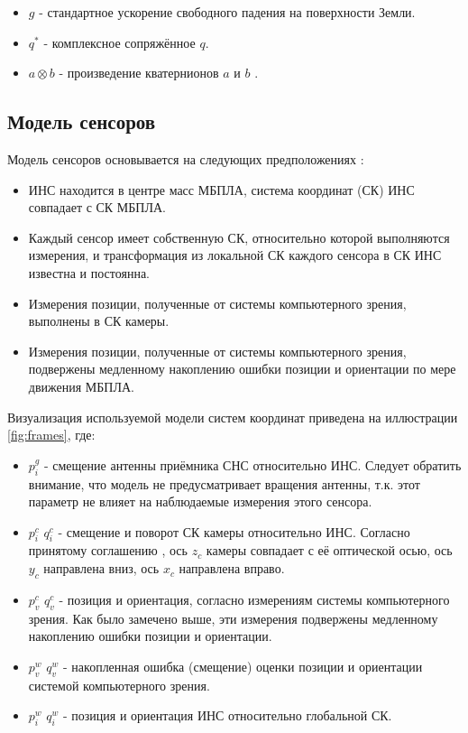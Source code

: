 \documentclass[11pt,a4paper]{article}
\begin{document}
\begin{itemize}
    \item $g$ - стандартное ускорение свободного падения на поверхности Земли.
    \item $q^*$ - комплексное сопряжённое $q$.
    \item $a \otimes b$ - произведение кватернионов $a$ и $b$ \cite{QuaternionsMadgwick}.
\end{itemize}

\subsection{Модель сенсоров}

Модель сенсоров основывается на следующих предположениях \cite{weiss2012vision}:

\begin{itemize}
    \item ИНС находится в центре масс МБПЛА, система координат (СК) ИНС совпадает с СК МБПЛА.
    \item Каждый сенсор имеет собственную СК, относительно которой выполняются измерения, и трансформация из локальной СК каждого сенсора в СК ИНС известна и постоянна.
    \item Измерения позиции, полученные от системы компьютерного зрения, выполнены в СК камеры.
    \item Измерения позиции, полученные от системы компьютерного зрения, подвержены медленному накоплению ошибки позиции и ориентации по мере движения МБПЛА.
\end{itemize}

Визуализация используемой модели систем координат приведена на иллюстрации \ref{fig:frames}, где:

\begin{itemize}
    \item $p_i^g$ - смещение антенны приёмника СНС относительно ИНС. Следует обратить внимание, что модель не предусматривает вращения антенны, т.к. этот параметр не влияет на наблюдаемые измерения этого сенсора.
    \item $p_i^c$ $q_i^c$ - смещение и поворот СК камеры относительно ИНС. Согласно принятому соглашению \cite{ROSFrames}, ось $z_c$ камеры совпадает с её оптической осью, ось $y_c$ направлена вниз, ось $x_c$ направлена вправо.
    \item $p_v^c$ $q_v^c$ - позиция и ориентация, согласно измерениям системы компьютерного зрения. Как было замечено выше, эти измерения подвержены медленному накоплению ошибки позиции и ориентации.
    \item $p_v^w$ $q_v^w$ - накопленная ошибка (смещение) оценки позиции и ориентации системой компьютерного зрения.
    \item $p_i^w$ $q_i^w$ - позиция и ориентация ИНС относительно глобальной СК.
\end{itemize}
\end{document}
